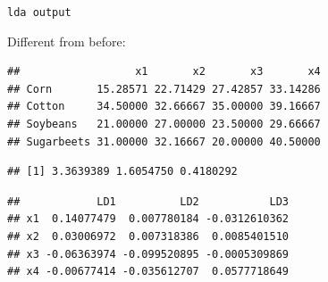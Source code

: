 \documentclass[ignorenonframetext,]{beamer}
\newenvironment{Shaded}{\begin{snugshade}}{\end{snugshade}}
\newcommand{\NormalTok}[1]{#1}
\newcommand{\OperatorTok}[1]{\textcolor[rgb]{0.81,0.36,0.00}{\textbf{#1}}}
\begin{document}
\begin{frame}[fragile]{\texttt{lda\ output}}
\protect\hypertarget{lda-output}{}

Different from before:

\footnotesize

\begin{Shaded}
\end{Shaded}

\begin{verbatim}
##                  x1       x2       x3       x4
## Corn       15.28571 22.71429 27.42857 33.14286
## Cotton     34.50000 32.66667 35.00000 39.16667
## Soybeans   21.00000 27.00000 23.50000 29.66667
## Sugarbeets 31.00000 32.16667 20.00000 40.50000
\end{verbatim}

\begin{Shaded}
\end{Shaded}

\begin{verbatim}
## [1] 3.3639389 1.6054750 0.4180292
\end{verbatim}

\begin{Shaded}
\end{Shaded}

\begin{verbatim}
##            LD1          LD2           LD3
## x1  0.14077479  0.007780184 -0.0312610362
## x2  0.03006972  0.007318386  0.0085401510
## x3 -0.06363974 -0.099520895 -0.0005309869
## x4 -0.00677414 -0.035612707  0.0577718649
\end{verbatim}

\normalsize

\end{frame}
\end{document}
